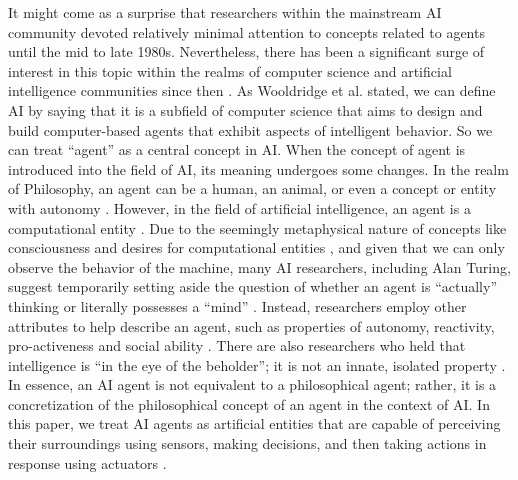 \documentclass{article}
\begin{document}
It might come as a surprise that researchers within the mainstream AI community devoted relatively minimal attention to concepts related to agents until the mid to late 1980s. 
Nevertheless, there has been a significant surge of interest in this topic within the realms of computer science and artificial intelligence communities since then \cite{DBLP:journals/jasis/MukhopadhyaySHB86,DBLP:journals/ras/Maes90a,nilsson1992toward,muller1994modelling}. 
As Wooldridge et al. \cite{DBLP:journals/ker/WooldridgeJ95} stated, we can define AI by saying that it is a subfield of computer science that aims to design and build computer-based agents that exhibit aspects of intelligent behavior. So we can treat ``agent'' as a central concept in AI. When the concept of agent is introduced into the field of AI, its meaning undergoes some changes. In the realm of Philosophy, an agent can be a human, an animal, or even a concept or entity with autonomy \cite{sep-agency}. 
However, in the field of artificial intelligence, an agent is a computational entity \cite{DBLP:journals/ker/WooldridgeJ95,green1997software}. 
Due to the seemingly metaphysical nature of concepts like consciousness and desires for computational entities \cite{DBLP:conf/law/Shoham92}, and given that we can only observe the behavior of the machine, many AI researchers, including Alan Turing, suggest temporarily setting aside the question of whether an agent is ``actually'' thinking or literally possesses a ``mind'' \cite{turing2009computing}. Instead, researchers employ other attributes to help describe an agent, such as properties of autonomy, reactivity, pro-activeness and social ability \cite{DBLP:journals/ker/WooldridgeJ95,DBLP:journals/logcom/Goodwin95}.
There are also researchers who held that intelligence is ``in the eye of the beholder''; it is not an innate, isolated property \cite{brooks1991intelligence,maes1990designing,brooks1986robust,brooks2018intelligence}.
In essence, an AI agent is not equivalent to a philosophical agent; rather, it is a concretization of the philosophical concept of an agent in the context of AI. 
In this paper, we treat AI agents as artificial entities that are capable of perceiving their surroundings using sensors, making decisions, and then taking actions in response using actuators \cite{russell2010artificial,DBLP:journals/ker/WooldridgeJ95}.
\end{document}
